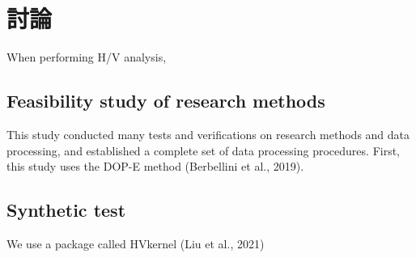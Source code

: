 
\chapter{討論}
When performing H/V analysis, 
\section{Feasibility study of research methods}
This study conducted many tests and verifications on research methods and data processing, and established a complete set of data processing procedures. First, this study uses the DOP-E method (Berbellini et al., 2019). 

\section{Synthetic test}
We use a package called HVkernel (Liu et al., 2021)

